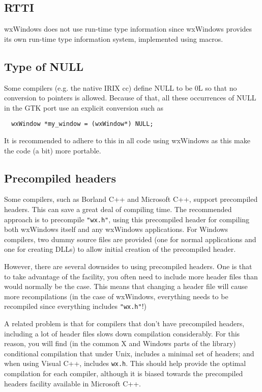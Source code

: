 \subsection{RTTI}

wxWindows does not use run-time type information since wxWindows provides
its own run-time type information system, implemented using macros.

\subsection{Type of NULL}

Some compilers (e.g. the native IRIX cc) define NULL to be 0L so that
no conversion to pointers is allowed. Because of that, all these
occurrences of NULL in the GTK port use an explicit conversion such 
as

{\small
\begin{verbatim}
  wxWindow *my_window = (wxWindow*) NULL;
\end{verbatim}
}

It is recommended to adhere to this in all code using wxWindows as
this make the code (a bit) more portable.

\subsection{Precompiled headers}

Some compilers, such as Borland C++ and Microsoft C++, support
precompiled headers. This can save a great deal of compiling time. The
recommended approach is to precompile {\tt "wx.h"}, using this
precompiled header for compiling both wxWindows itself and any
wxWindows applications. For Windows compilers, two dummy source files
are provided (one for normal applications and one for creating DLLs)
to allow initial creation of the precompiled header.

However, there are several downsides to using precompiled headers. One
is that to take advantage of the facility, you often need to include
more header files than would normally be the case. This means that
changing a header file will cause more recompilations (in the case of
wxWindows, everything needs to be recompiled since everything includes {\tt "wx.h"}!)

A related problem is that for compilers that don't have precompiled
headers, including a lot of header files slows down compilation
considerably. For this reason, you will find (in the common
X and Windows parts of the library) conditional
compilation that under Unix, includes a minimal set of headers;
and when using Visual C++, includes {\tt wx.h}. This should help provide
the optimal compilation for each compiler, although it is
biased towards the precompiled headers facility available
in Microsoft C++.

